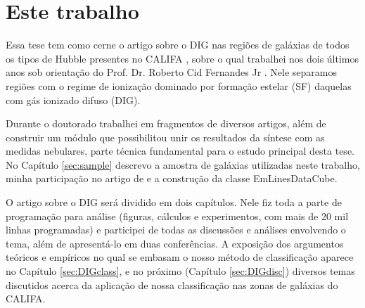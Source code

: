 \section{Este trabalho}
\label{sec:intro:estetrabalho}

Essa tese tem como cerne o artigo sobre o DIG nas regiões de galáxias de todos os tipos de Hubble presentes no CALIFA  \citep[][Apêndice \ref{apendice:DIGpaper0}]{Lacerda.etal.2018}, sobre o qual trabalhei nos dois últimos anos sob orientação do Prof. Dr. Roberto Cid Fernandes Jr . Nele separamos regiões com o regime de ionização dominado por formação estelar (SF) daquelas com gás ionizado difuso (DIG).

Durante o doutorado trabalhei em fragmentos de diversos artigos, além de construir um módulo que possibilitou unir os resultados da síntese com as medidas nebulares, parte técnica fundamental para o estudo principal desta tese. No Capítulo \ref{sec:sample} descrevo a amostra de galáxias utilizadas neste trabalho, minha participação no artigo de \citet[][Apêndice \ref{apendice:GBetal2015a}]{GarciaBenito.etal.2015a} e a construção da classe EmLinesDataCube.

O artigo sobre o DIG será dividido em dois capítulos. Nele fiz toda a parte de programação para análise (figuras, cálculos e experimentos, com mais de 20 mil linhas programadas) e participei de todas as discussões e análises envolvendo o tema, além de apresentá-lo em duas conferências. A exposição dos argumentos teóricos e empíricos no qual se embasam o nosso método de classificação aparece no Capítulo \ref{sec:DIGclass}, e no próximo (Capítulo \ref{sec:DIGdisc}) diversos temas discutidos acerca da aplicação de nossa classificação nas zonas de galáxias do CALIFA.




